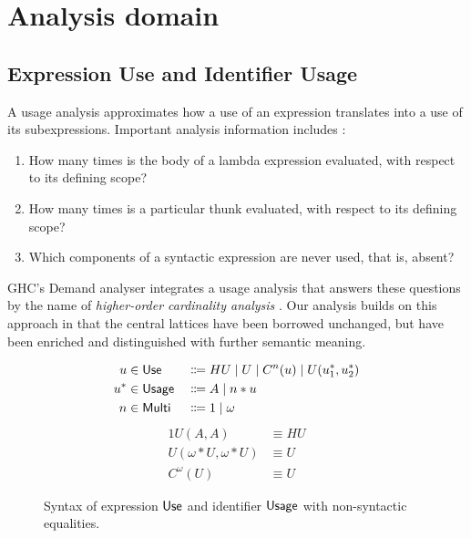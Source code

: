 \section{Analysis domain}


\subsection{Expression Use and Identifier Usage}

A usage analysis approximates how a use of an expression translates into a use of its subexpressions. Important analysis information includes \parencite{card}:

\begin{enumerate}
\item How many times is the body of a lambda expression evaluated, with respect to its defining scope?
\item How many times is a particular thunk evaluated, with respect to its defining scope?
\item Which components of a syntactic expression are never used, that is, absent?
\end{enumerate}

GHC's Demand analyser integrates a usage analysis that answers these questions by the name of \emph{higher-order cardinality analysis} \parencite{card}. 
Our analysis builds on this approach in that the central lattices have been borrowed unchanged, but have been enriched and distinguished with further semantic meaning.

\begin{figure}
\begin{alignat*}{2}
u   &\in \text{\textsf{Use}}   &{} \Coloneqq {}& HU \mid U \mid C^n(u) \mid U(u^*_1, u^*_2) \\
u^* &\in \text{\textsf{Usage}} &{} \Coloneqq {}& A \mid n*u \\
n   &\in \text{\textsf{Multi}} &{} \Coloneqq {}& 1 \mid \omega
\end{alignat*}
\begin{alignat*}{1}
U(A,A)               &\equiv HU \\
U(\omega*U,\omega*U) &\equiv U \\
C^\omega(U)          &\equiv U
\end{alignat*}
\caption{Syntax of expression $\text{\textsf{Use}}$ and identifier $\text{\textsf{Usage}}$ with non-syntactic equalities.}
\label{fig:usg}
\end{figure}


